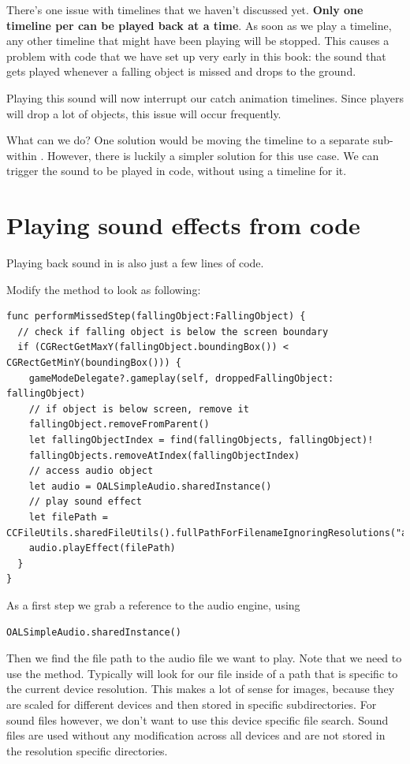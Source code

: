There's one issue with timelines that we haven't discussed yet. \textbf{Only one
timeline per \ccbfile{} can be played back at a time}. As soon as we play a
timeline, any other timeline that might have been playing will be stopped. This causes a problem
with code that we have set up very early in this book: the sound that gets
played whenever a falling object is missed and drops to the ground.

Playing this sound will now interrupt our catch animation timelines. Since
players will drop a lot of objects, this issue will occur frequently.

What can we do? One solution would be moving the timeline to a separate
sub-\ccbfile{} within . However, there is luckily a
simpler solution for this use case. We can trigger the sound to be played in
code, without using a timeline for it.

\section{Playing sound effects from code}
Playing back sound in \cocos{} is also just a few lines of code.

\begin{leftbar}
Modify the  method to look as following:
\begin{lstlisting}
func performMissedStep(fallingObject:FallingObject) {
  // check if falling object is below the screen boundary
  if (CGRectGetMaxY(fallingObject.boundingBox()) < CGRectGetMinY(boundingBox())) {
    gameModeDelegate?.gameplay(self, droppedFallingObject: fallingObject)
    // if object is below screen, remove it
    fallingObject.removeFromParent()
    let fallingObjectIndex = find(fallingObjects, fallingObject)!
    fallingObjects.removeAtIndex(fallingObjectIndex)
    // access audio object
    let audio = OALSimpleAudio.sharedInstance()
    // play sound effect
    let filePath = CCFileUtils.sharedFileUtils().fullPathForFilenameIgnoringResolutions("assets/drop.caf")
    audio.playEffect(filePath)
  }
}
\end{lstlisting} 
\end{leftbar}

As a first step we grab a reference to the audio engine, using
\begin{lstlisting}
OALSimpleAudio.sharedInstance()
\end{lstlisting} 
Then we find the file path to the audio file we want to play. Note that we need
to use the  method. Typically
 will look for our file inside of a path that is
specific to the current device resolution. This makes a lot of sense for images,
because they are scaled for different devices and then stored in specific
subdirectories. For sound files however, we don't want to use this device
specific file search. Sound files are used without any modification across all
devices and are not stored in the resolution specific directories.


